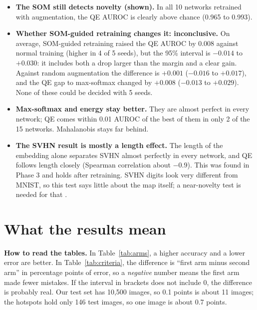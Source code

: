 \documentclass[11pt]{article}
\begin{document}
\begin{itemize}[leftmargin=1.4em, itemsep=2pt]
  \item \textbf{The SOM still detects novelty (shown).} In all 10 networks retrained with augmentation, the QE AUROC is clearly above chance (0.965 to 0.993).
  \item \textbf{Whether SOM-guided retraining changes it: inconclusive.} On average, SOM-guided retraining raised the QE AUROC by 0.008 against normal training (higher in 4 of 5 seeds), but the 95\% interval is $-0.014$ to $+0.030$: it includes both a drop larger than the margin and a clear gain. Against random augmentation the difference is $+0.001$ ($-0.016$ to $+0.017$), and the QE gap to max-softmax changed by $+0.008$ ($-0.013$ to $+0.029$). None of these could be decided with 5 seeds.
  \item \textbf{Max-softmax and energy stay better.} They are almost perfect in every network; QE comes within 0.01 AUROC of the best of them in only 2 of the 15 networks. Mahalanobis stays far behind.
  \item \textbf{The SVHN result is mostly a length effect.} The length of the embedding alone separates SVHN almost perfectly in every network, and QE follows length closely (Spearman correlation about $-0.9$). This was found in Phase 3 and holds after retraining. SVHN digits look very different from MNIST, so this test says little about the map itself; a near-novelty test is needed for that \parencite{nalisnick2019deep}.
\end{itemize}

\section{What the results mean}\label{sec:meaning}

\textbf{How to read the tables.} In Table~\ref{tab:arms}, a higher accuracy and a lower error are better. In Table~\ref{tab:criteria}, the difference is ``first arm minus second arm'' in percentage points of error, so a \emph{negative} number means the first arm made fewer mistakes. If the interval in brackets does not include 0, the difference is probably real. Our test set has 10{,}500 images, so 0.1 points is about 11 images; the hotspots hold only 146 test images, so one image is about 0.7 points.
\end{document}
